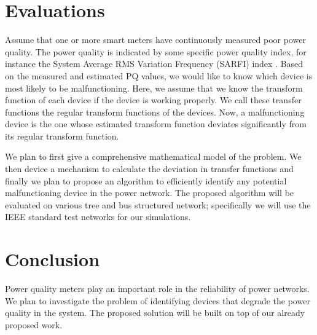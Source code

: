\section{Evaluations}
Assume that one or more smart meters have continuously measured poor power quality. The power quality is indicated by some specific power quality index, for instance the System Average RMS Variation Frequency (SARFI) index . Based on the measured and estimated PQ values, we would like to know which device is most likely to be malfunctioning. Here, we assume that we know the transform function of each device if the device is working properly. We call these transfer functions the regular transform functions of the devices. Now, a malfunctioning device is the one whose estimated transform function deviates significantly from its regular transform function.

We plan to first give a comprehensive mathematical model of the problem. We then device a mechanism to calculate the deviation in transfer functions and finally we plan to propose an algorithm to efficiently identify any potential malfunctioning device in the power network. The proposed algorithm will be evaluated on various tree and bus structured network; specifically we will use the IEEE standard test networks for our simulations.

\section{Conclusion}
Power quality meters play an important role in the reliability of power networks. We plan to investigate the problem of identifying devices that degrade the power quality in the system. The proposed solution will be built on top of our already proposed work.